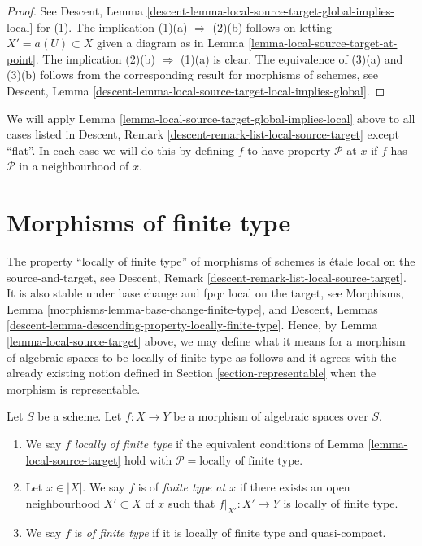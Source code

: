 \begin{proof}
See
Descent, Lemma \ref{descent-lemma-local-source-target-global-implies-local}
for (1). The implication (1)(a) $\Rightarrow$ (2)(b) follows on letting
$X' = a(U) \subset X$ given a diagram as in
Lemma \ref{lemma-local-source-target-at-point}.
The implication (2)(b) $\Rightarrow$ (1)(a) is clear.
The equivalence of (3)(a) and (3)(b) follows from the corresponding
result for morphisms of schemes, see
Descent, Lemma \ref{descent-lemma-local-source-target-local-implies-global}.
\end{proof}

\begin{remark}
\label{remark-when-apply}
We will apply
Lemma \ref{lemma-local-source-target-global-implies-local}
above to all cases listed in
Descent, Remark \ref{descent-remark-list-local-source-target}
except ``flat''. In each case we will do this by defining
$f$ to have property $\mathcal{P}$ at $x$ if $f$ has
$\mathcal{P}$ in a neighbourhood of $x$.
\end{remark}




\section{Morphisms of finite type}
\label{section-finite-type}

\noindent
The property ``locally of finite type'' of morphisms of schemes
is \'etale local on the source-and-target, see
Descent, Remark \ref{descent-remark-list-local-source-target}.
It is also stable under base change and fpqc local on the target, see
Morphisms, Lemma \ref{morphisms-lemma-base-change-finite-type}, and
Descent, Lemmas \ref{descent-lemma-descending-property-locally-finite-type}.
Hence, by
Lemma \ref{lemma-local-source-target}
above, we may define what it means for a morphism of algebraic spaces
to be locally of finite type as
follows and it agrees with the already existing notion defined in
Section \ref{section-representable}
when the morphism is representable.

\begin{definition}
\label{definition-locally-finite-type}
Let $S$ be a scheme.
Let $f : X \to Y$ be a morphism of algebraic spaces over $S$.
\begin{enumerate}
\item We say $f$
{\it locally of finite type} if the equivalent conditions of
Lemma \ref{lemma-local-source-target}
hold with
$\mathcal{P} = \text{locally of finite type}$.
\item Let $x \in |X|$. We say $f$ is of {\it finite type at $x$}
if there exists an open neighbourhood $X' \subset X$ of $x$ such
that $f|_{X'} : X' \to Y$ is locally of finite type.
\item We say $f$ is
{\it of finite type} if it is locally of finite type and quasi-compact.
\end{enumerate}
\end{definition}

